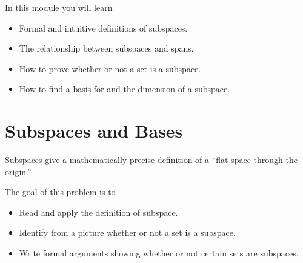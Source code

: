 \documentclass{workbook}
\newcommand{\bookonlynewpage}{\begin{bookonly}\newpage\end{bookonly}}
\begin{document}
\begin{module}\label{MODULEBASIS}

	In this module you will learn
	\begin{itemize}
		\item Formal and intuitive definitions of subspaces.
		\item The relationship between subspaces and spans.
		\item How to prove whether or not a set is a subspace.
		\item How to find a basis for and the dimension of a subspace.
	\end{itemize}

	
	
\end{module}
\begin{slide}
	\bookonlynewpage
\section*{Subspaces and Bases}
	\vspace{-1em}

	Subspaces give a mathematically precise definition of a ``flat space through the origin.''

	\question
	\begin{annotation}
		\begin{goals}

			The goal of this problem is to
			\begin{itemize}
				\item Read and apply the definition of subspace.
				\item Identify from a picture whether or not a set is a subspace.
				\item Write formal arguments showing whether or not certain sets are subspaces.
			\end{itemize}
		\end{goals}


\end{annotation}
\end{slide}
\end{document}
